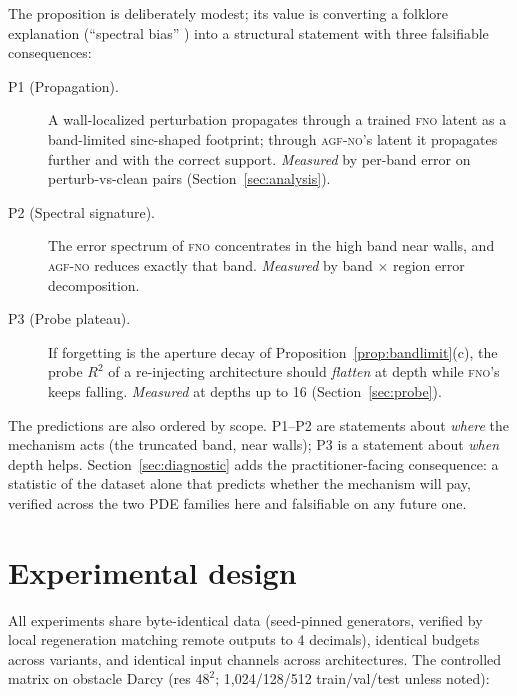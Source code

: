 \documentclass[11pt]{article}
\theoremstyle{definition}
\newcommand{\fno}{\textsc{fno}}
\newcommand{\agfno}{\textsc{agf-no}}
\newcommand{\Rtwo}{R^2}
\begin{document}
The proposition is deliberately modest; its value is converting a folklore
explanation (``spectral bias'' \citep{rahaman2019spectral, rahaman2019cnn,
basri2020frequency, wang2022freq}) into a structural statement with three
falsifiable consequences:

\begin{description}
\item[P1 (Propagation).] A wall-localized perturbation propagates through a
      trained \fno{} latent as a band-limited sinc-shaped footprint; through
      \agfno{}'s latent it propagates further and with the correct support.
      \emph{Measured} by per-band error on perturb-vs-clean pairs
      (Section~\ref{sec:analysis}).
\item[P2 (Spectral signature).] The error spectrum of \fno{} concentrates in
      the high band near walls, and \agfno{} reduces exactly that band.
      \emph{Measured} by band $\times$ region error decomposition.
\item[P3 (Probe plateau).] If forgetting is the aperture decay of
      Proposition~\ref{prop:bandlimit}(c), the probe $\Rtwo$ of a re-injecting
      architecture should \emph{flatten} at depth while \fno{}'s keeps
      falling. \emph{Measured} at depths up to 16 (Section~\ref{sec:probe}).
\end{description}

The predictions are also ordered by scope. P1--P2 are statements about
\emph{where} the mechanism acts (the truncated band, near walls); P3 is a
statement about \emph{when} depth helps. Section~\ref{sec:diagnostic} adds
the practitioner-facing consequence: a statistic of the dataset alone that
predicts whether the mechanism will pay, verified across the two PDE
families here and falsifiable on any future one.

\section{Experimental design}
\label{sec:design}

All experiments share byte-identical data (seed-pinned generators, verified
by local regeneration matching remote outputs to 4 decimals), identical
budgets across variants, and identical input channels across architectures.
The controlled matrix on obstacle Darcy (res $48^2$; 1{,}024/128/512
train/val/test unless noted):
\end{document}
